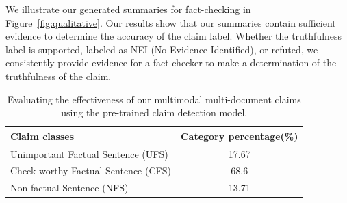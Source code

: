 We illustrate our generated summaries for fact-checking in Figure~\ref{fig:qualitative}. Our results show that our summaries contain sufficient evidence to determine the accuracy of the claim label. Whether the truthfulness label is supported, labeled as NEI (No Evidence Identified), or refuted, we consistently provide evidence for a fact-checker to make a determination of the truthfulness of the claim.

\begin{table}[h]\Large
\centering
\caption{Evaluating the effectiveness of our multimodal multi-document claims using the pre-trained claim detection model.}
\begin{tabular}{l|c}
\hline
\textbf{Claim classes}                    & \textbf{Category percentage(\%)}  \\\hline
Unimportant Factual Sentence (UFS)        & 17.67          \\
Check-worthy Factual Sentence (CFS)       & 68.6           \\
Non-factual Sentence (NFS)                & 13.71          \\\hline
\end{tabular}
\label{label:claim_detect}
\end{table}
